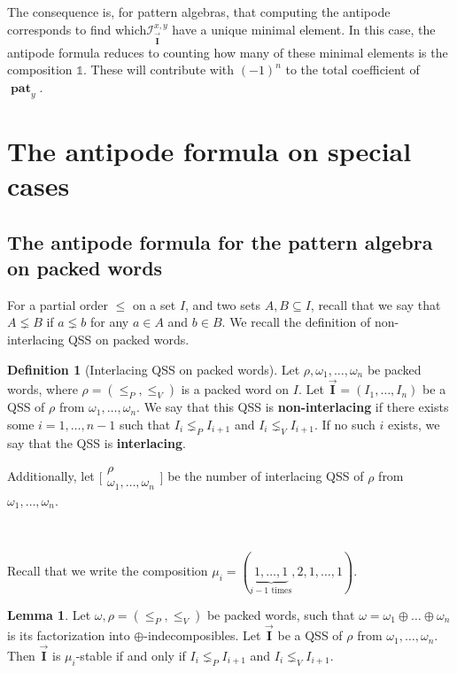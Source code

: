 \documentclass[12pt, reqno]{amsart}
\theoremstyle{definition}
\newtheorem{lm}[thm]{Lemma}
\newtheorem{defin}[thm]{Definition}
\newcommand{\III}{\vec{\mathbf{I}}}
\DeclareMathOperator{\pat}{\mathbf{pat}}
\begin{document}

The consequence is, for pattern algebras, that computing the antipode corresponds to find which$ \mathcal I_{\III}^{x, y}$ have a unique minimal element.
In this case, the antipode formula reduces to counting how many of these minimal elements is the composition $\mathbb{1}$.
These will contribute with $(-1)^n$ to the total coefficient of $\pat_y$.
\section{The antipode formula on special cases\label{sec:formula_pp}}
\subsection{The antipode formula for the pattern algebra on packed words \label{sec:formula_packed}}
For a partial order $\leq$ on a set $I$, and two sets $A, B \subseteq I$, recall that we say that $A \lneq B$ if $a \lneq b$ for any $a \in A$ and $b \in B$.
We recall the definition of non-interlacing QSS on packed words.


\begin{defin}[Interlacing QSS on packed words]
Let $\rho, \omega_1, \dots, \omega_n$ be packed words, where $\rho = (\leq_P, \leq_V)$ is a packed word on $I$.
Let $\III = (I_1, \dots, I_n)$ be a QSS of $\rho$ from $\omega_1, \dots, \omega_n$.
We say that this QSS is \textbf{non-interlacing} if there exists some $i = 1, \dots, n-1$ such that $I_i \lneq_P I_{i+1}$ and $I_i \lneq_V I_{i+1}$.
If no such $i$ exists, we say that the QSS is \textbf{interlacing}.

Additionally, let $ \bigl[\!\begin{smallmatrix} \rho  \\ \omega_1, \dots, \omega_n \end{smallmatrix}\!\bigr]$ be the number of interlacing QSS of $\rho$ from $\omega_1, \dots, \omega_n$.
\end{defin}

\

Recall that we write the composition $\mu_i = (\underbrace{1, \dots , 1}_\text{$i-1$ times}, 2, 1, \dots, 1)$.

\begin{lm}\label{lm:QSSpackedWords}
Let $\omega, \rho = (\leq_P, \leq_V)$ be packed words, such that $\omega = \omega_1 \oplus \dots \oplus \omega_n$ is its factorization into $\oplus$-indecomposibles.
Let $\III$ be a QSS of $\rho$ from $\omega_1, \dots , \omega_n$.
Then $\III$ is $\mu_i$-stable if and only if $I_i \lneq_P I_{i+1}$ and $I_i \lneq_V I_{i+1}$.
\end{lm}
\end{document}
